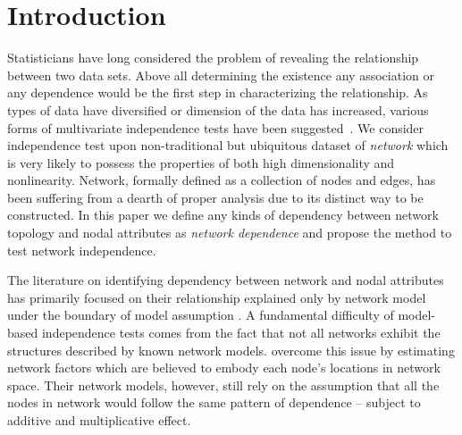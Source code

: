 \documentclass[11pt]{article}
\theoremstyle{definition}
\begin{document}
\section{Introduction}
\label{sec:intro}
	\vspace*{-0.2cm}
Statisticians have long considered the problem of revealing the relationship between two data sets. Above all determining the existence any association or any dependence would be the first step in characterizing the relationship. As types of data have diversified or dimension of the data has increased, various forms of multivariate independence tests have been suggested~\citep{taskinen2005multivariate, heller2012consistent, szekely2007measuring}. We consider independence test upon non-traditional but ubiquitous dataset of \textit{network} which is very likely to possess the properties of both high dimensionality and nonlinearity. Network, formally defined as a collection of nodes and edges, has been suffering from a dearth of proper analysis due to its distinct way to be constructed. In this paper we define any kinds of dependency between network topology and nodal attributes as \textit{network dependence} and propose the method to test network independence. 

The literature on identifying dependency between network and nodal attributes has primarily focused on their relationship explained only by network model under the boundary of model assumption \citep{wasserman1996logit, howard2016understanding}. A fundamental difficulty of model-based independence tests comes from the fact that not all networks exhibit the structures described by known network models. \cite{fosdick2015testing} overcome this issue by estimating network factors which are believed to embody each node's locations in network space. Their network models, however, still rely on the assumption that all the nodes in network would follow the same pattern of dependence -- subject to additive and multiplicative effect. 
\end{document}
